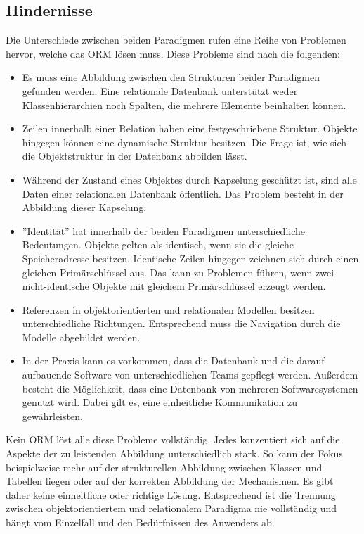 \subsection{Hindernisse}
Die Unterschiede zwischen beiden Paradigmen rufen eine Reihe von Problemen hervor, welche das ORM lösen muss. Diese Probleme sind nach \cite{ireland_understanding_2009} die folgenden:
\begin{itemize}
    \item Es muss eine Abbildung zwischen den Strukturen beider Paradigmen gefunden werden. Eine relationale Datenbank unterstützt weder Klassenhierarchien noch Spalten, die mehrere Elemente beinhalten können.
    \item Zeilen innerhalb einer Relation haben eine festgeschriebene Struktur. Objekte hingegen können eine dynamische Struktur besitzen. Die Frage ist, wie sich die Objektstruktur in der Datenbank abbilden lässt.
    \item Während der Zustand eines Objektes durch Kapselung geschützt ist, sind alle Daten einer relationalen Datenbank öffentlich. Das Problem besteht in der Abbildung dieser Kapselung.
    \item ''Identität'' hat innerhalb der beiden Paradigmen unterschiedliche Bedeutungen. Objekte gelten als identisch, wenn sie die gleiche Speicheradresse besitzen. Identische Zeilen hingegen zeichnen sich durch einen gleichen Primärschlüssel aus. Das kann zu Problemen führen, wenn zwei nicht-identische Objekte mit gleichem Primärschlüssel erzeugt werden.
    \item Referenzen in objektorientierten und relationalen Modellen besitzen unterschiedliche Richtungen. Entsprechend muss die Navigation durch die Modelle abgebildet werden.
    \item In der Praxis kann es vorkommen, dass die Datenbank und die darauf aufbauende Software von unterschiedlichen Teams gepflegt werden. Außerdem besteht die Möglichkeit, dass eine Datenbank von mehreren Softwaresystemen genutzt wird. Dabei gilt es, eine einheitliche Kommunikation zu gewährleisten.
\end{itemize}
Kein ORM löst alle diese Probleme vollständig. Jedes konzentiert sich auf die Aspekte der zu leistenden Abbildung unterschiedlich stark. So kann der Fokus beispielweise mehr auf der strukturellen Abbildung zwischen Klassen und Tabellen liegen oder auf der korrekten Abbildung der Mechanismen. Es gibt daher keine einheitliche oder richtige Lösung. Entsprechend ist die Trennung zwischen objektorientiertem und relationalem Paradigma nie vollständig und hängt vom Einzelfall und den Bedürfnissen des Anwenders ab.

